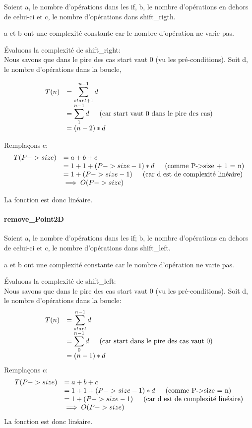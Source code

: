 \documentclass[a4paper, 11pt, oneside]{article}
\begin{document}
Soient a, le nombre d'opérations dans les if, b, le nombre d'opérations en dehors de celui-ci et c, le nombre d'opérations dans shift\_rigth.

\noindent a et b ont une complexité constante car le nombre d'opération ne varie pas.

Évaluons la complexité de shift\_right:\\
Nous savons que dans le pire des cas start vaut 0 (vu les pré-conditions). Soit d, le nombre d'opérations dans la boucle, 

$$
\begin{array}{ll}
T(n) 
&= \displaystyle \sum_{start+1}^{n-1}d\\
&= \displaystyle \sum_{1}^{n-1}d \text{\indent(car start vaut 0 dans le pire des cas)}\\
&= (n-2)*d \\
\end{array}
$$

Remplaçons c:
$$
\begin{array}{ll}
T(P->size) 
&= a + b + c\\
&= 1 + 1 + (P->size-1)*d \text{\indent(comme P->size + 1 = n)}\\
&= 1 + (P->size-1) \text{\indent(car d est de complexité linéaire)}\\
&\implies O(P->size)\\
\end{array}
$$

La fonction est donc linéaire.

\paragraph{remove\_Point2D}

Soient a, le nombre d'opérations dans les if; b, le nombre d'opérations en dehors de celui-ci et c, le nombre d'opérations dans shift\_left.

\noindent a et b ont une complexité constante car le nombre d'opération ne varie pas.

Évaluons la complexité de shift\_left:\\
Nous savons que dans le pire des cas start vaut 0 (vu les pré-conditions). Soit d, le nombre d'opérations dans la boucle:
$$
\begin{array}{ll}
T(n)
&= \displaystyle \sum_{start}^{n-1}d\\
&= \displaystyle \sum_0^{n-1}d \text{\indent(car start dans le pire des cas vaut 0)}\\
&= (n-1)*d\\
\end{array}
$$
Remplaçons c:
$$
\begin{array}{ll}
T(P->size) 
&= a + b + c\\
&= 1 + 1 + (P->size-1)*d   \text{\indent(comme P->size = n)} \\
&= 1 + (P->size-1)  \text{\indent(car d est de complexité linéaire)} \\
&\implies O(P->size)\\
\end{array}
$$
La fonction est donc linéaire.
\end{document}
